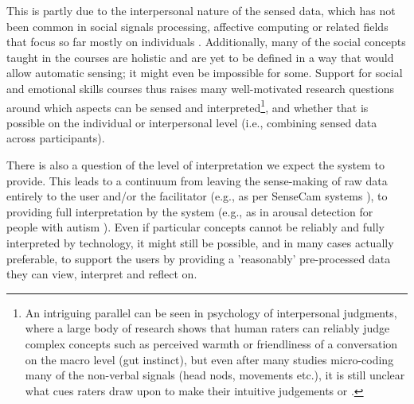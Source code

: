 \documentclass[prodmode,acmtochi]{acmsmall}
\begin{document}
This is partly due to the interpersonal nature of the sensed data, which has not been common in social signals processing, affective computing or related fields that focus so far mostly on individuals \cite{Vinciarelli2012}. Additionally, many of the social concepts taught in the courses are holistic and are yet to be defined in a way that would allow automatic sensing; it might even be impossible for some. Support for social and emotional skills courses thus raises many well-motivated research questions around which aspects can be sensed and interpreted\footnote{An intriguing parallel can be seen in psychology of interpersonal judgments, where a large body of research shows that human raters can reliably judge complex concepts such as perceived warmth or friendliness of a conversation on the macro level (gut instinct), but even after many studies micro-coding many of the non-verbal signals (head nods, movements etc.), it is still unclear what cues raters draw upon to make their intuitive judgements \cite{Ambady2000} or \cite[p.299]{harrigan2008}.}, and whether that is possible on the individual or interpersonal level (i.e., combining sensed data across participants).

There is also a question of the level of interpretation we expect the system to provide. This leads to a continuum from leaving the sense-making of raw data entirely to the user and/or the facilitator (e.g., as per SenseCam systems \cite{Fleck2009}), to providing full interpretation by the system (e.g., as in arousal detection for people with autism \cite{Picard2009}). Even if particular concepts cannot be reliably and fully interpreted by technology, it might still be possible, and in many cases actually preferable, to support the users by providing a 'reasonably' pre-processed data they can view, interpret and reflect on.
\end{document}
